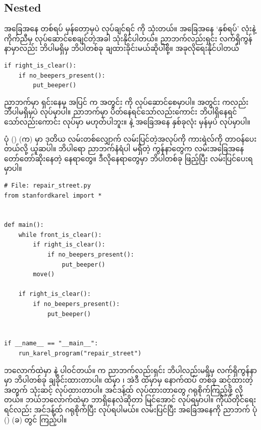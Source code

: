 \subsection*{Nested }
အခြေအနေ တစ်ရပ် မှန်တော့မှပဲ လုပ်ချင်ရင်  ကို သုံးတယ်။  
အခြေအနေ ‘နှစ်ရပ်’ လုံးနဲ့ ကိုက်ညီမှ လုပ်ဆောင်စေချင်တဲ့အခါ   သုံးနိုင်ပါတယ်။ ညာဘက်လည်းရှင်း လက်ရှိကွန်နာမှာလည်း ဘိပါမရှိမှ ဘိပါတစ်ခု ချထားခိုင်းမယ်ဆိုပါစို့။ အခုလိုရေးနိုင်ပါတယ်
%
\setlength{\fboxsep}{0pt}
\begin{verbatim}
if right_is_clear():
    if no_beepers_present():
        put_beeper()
\end{verbatim}
%
ညာဘက်မှာ ရှင်းနေမှ အပြင်  က အတွင်း  ကို လုပ်ဆောင်စေမှာပါ။ အတွင်း  ကလည်း ဘိပါမရှိမှပဲ  လုပ်မှာပါ။ ညာဘက်မှာ ပိတ်နေရင်သော်လည်းကောင်း ဘိပါရှိနေရင်သော်လည်းကောင်း  လုပ်မှာ မဟုတ်ပါဘူး။  နဲ့  အခြေအနေ နှစ်ခုလုံး မှန်မှပဲ လုပ်မှာပါ။

ပုံ (\fRefNo{\ref{fig:st_repair}}) (က) မှာ ဒုတိယ လမ်းတစ်လျှောက် လမ်းပြင်တဲ့အလုပ်ကို ကားရဲလ်ကို တာဝန်ပေးတယ်လို့ ယူဆပါ။ ဘိပါရော ညာဘက်နံရံပါ မရှိတဲ့ ကွန်နာတွေက  လမ်းအခြေအနေ တော်တော်ဆိုးနေတဲ့ နေရာတွေ။ ဒီလိုနေရာတွေမှာ ဘိပါတစ်ခု ဖြည့်ပြီး လမ်းပြင်ပေးရမှာပါ။ 
%
\label{lst:repair_street}
\setlength{\fboxsep}{0pt}
\begin{verbatim}
# File: repair_street.py
from stanfordkarel import *


def main():
    while front_is_clear():
        if right_is_clear():
            if no_beepers_present():
                put_beeper()
        move()

    if right_is_clear():
        if no_beepers_present():
            put_beeper()


if __name__ == "__main__":
    run_karel_program("repair_street")
\end{verbatim}
%
 ဘလောက်ထဲမှာ   နဲ့  ပါဝင်တယ်။   က ညာဘက်လည်းရှင်း ဘိပါလည်းမရှိမှ လက်ရှိကွန်နာမှာ ဘိပါတစ်ခု ချခိုင်းထားတာပါ။   ထဲမှာ ၊ အဲဒီ  ထဲမှာမှ နောက်ထပ်  တစ်ခု ဆင့်ထားတဲ့အတွက် သုံးဆင့်  လုပ်ထားတာပါ။ အင်ဒန့်ထ် လုပ်ထားတာတွေ ဂရုစိုက်ကြည့်ဖို့ လိုတယ်။ ဘယ်ဘလောက်ထဲမှာ ဘာရှိနေလဲဆိုတာ မြင်အောင် လုပ်ရမှာပါ။ ကိုယ်တိုင်ရေးရင်လည်း အင်ဒန့်ထ် ဂရုစိုက်ပြီး လုပ်ရပါမယ်။ လမ်းပြင်ပြီး အခြေအနေကို ညာဘက် ပုံ (\fRefNo{\ref{fig:st_repair}}) (ခ) တွင် ကြည့်ပါ။

